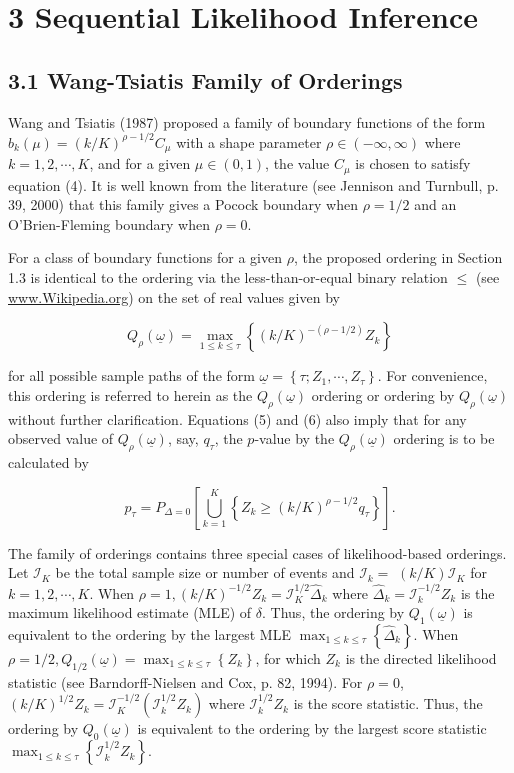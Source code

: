 \documentclass[10pt]{article}
\begin{document}
\section*{3 Sequential Likelihood Inference}
\subsection*{3.1 Wang-Tsiatis Family of Orderings}
Wang and Tsiatis (1987) proposed a family of boundary functions of the form $b_{k}(\mu)=(k / K)^{\rho-1 / 2} C_{\mu}$ with a shape parameter $\rho \in(-\infty, \infty)$ where $k=1,2, \cdots, K$, and for a given $\mu \in(0,1)$, the value $C_{\mu}$ is chosen to satisfy equation (4). It is well known from the literature (see Jennison and Turnbull, p. 39, 2000) that this family gives a Pocock boundary when $\rho=1 / 2$ and an O'Brien-Fleming boundary when $\rho=0$.

For a class of boundary functions for a given $\rho$, the proposed ordering in Section 1.3 is identical to the ordering via the less-than-or-equal binary relation $\leq$ (see \href{http://www.Wikipedia.org}{www.Wikipedia.org}) on the set of real values given by

$$
Q_{\rho}(\underline{\omega})=\max _{1 \leq k \leq \tau}\left\{(k / K)^{-(\rho-1 / 2)} Z_{k}\right\}
$$

for all possible sample paths of the form $\underline{\omega}=\left\{\tau ; Z_{1}, \cdots, Z_{\tau}\right\}$. For convenience, this ordering is referred to herein as the $Q_{\rho}(\underline{\omega})$ ordering or ordering by $Q_{\rho}(\underline{\omega})$ without further clarification. Equations (5) and (6) also imply that for any observed value of $Q_{\rho}(\underline{\omega})$, say, $q_{\tau}$, the $p$-value by the $Q_{\rho}(\underline{\omega})$ ordering is to be\\
calculated by


\begin{equation*}
p_{\tau}=P_{\Delta=0}\left[\bigcup_{k=1}^{K}\left\{Z_{k} \geq(k / K)^{\rho-1 / 2} q_{\tau}\right\}\right] . \tag{14}
\end{equation*}


The family of orderings contains three special cases of likelihood-based orderings. Let $\mathcal{I}_{K}$ be the total sample size or number of events and $\mathcal{I}_{k}=$ $(k / K) \mathcal{I}_{K}$ for $k=1,2, \cdots, K$. When $\rho=1,(k / K)^{-1 / 2} Z_{k}=\mathcal{I}_{K}^{1 / 2} \hat{\Delta}_{k}$ where $\hat{\Delta}_{k}=\mathcal{I}_{k}^{-1 / 2} Z_{k}$ is the maximum likelihood estimate (MLE) of $\delta$. Thus, the ordering by $Q_{1}(\underline{\omega})$ is equivalent to the ordering by the largest MLE $\max _{1 \leq k \leq \tau}\left\{\hat{\Delta}_{k}\right\}$. When $\rho=1 / 2, Q_{1 / 2}(\underline{\omega})=\max _{1 \leq k \leq \tau}\left\{Z_{k}\right\}$, for which $Z_{k}$ is the directed likelihood statistic (see Barndorff-Nielsen and Cox, p. 82, 1994). For $\rho=0$, $(k / K)^{1 / 2} Z_{k}=\mathcal{I}_{K}^{-1 / 2}\left(\mathcal{I}_{k}^{1 / 2} Z_{k}\right)$ where $\mathcal{I}_{k}^{1 / 2} Z_{k}$ is the score statistic. Thus, the ordering by $Q_{0}(\underline{\omega})$ is equivalent to the ordering by the largest score statistic $\max _{1 \leq k \leq \tau}\left\{\mathcal{I}_{k}^{1 / 2} Z_{k}\right\}$.
\end{document}
